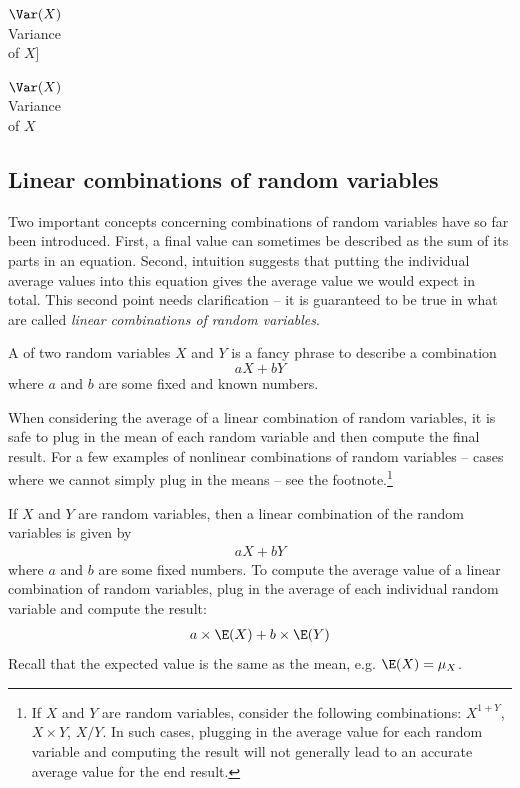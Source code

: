 $\Var(X)$\vspace{1mm}\\\footnotesize Variance\\of $X$]{\raggedright\vspace{-47mm}

$\Var(X)$\vspace{1mm}\\\footnotesize Variance\\of $X$}


\subsection{Linear combinations of random variables}

	Two important concepts concerning combinations of random variables have so far been introduced. First, a final value can sometimes be described as the sum of its parts in an equation. Second, intuition suggests that putting the individual average values into this equation gives the average value we would expect in total. This second point needs clarification -- it is guaranteed to be true in what are called \emph{linear combinations of random variables}.

	A  of two random variables $X$ and $Y$ is a fancy phrase to describe a combination
	$$ aX + bY$$
	where $a$ and $b$ are some fixed and known numbers.

	When considering the average of a linear combination of random variables, it is safe to plug in the mean of each random variable and then compute the final result. For a few examples of nonlinear combinations of random variables -- cases where we cannot simply plug in the means -- see the footnote.\footnote{If $X$ and $Y$ are random variables, consider the following combinations: $X^{1+Y}$, $X\times Y$, $X/Y$. In such cases, plugging in the average value for each random variable and computing the result will not generally lead to an accurate average value for the end result.}

	\begin{termBox}{
	If $X$ and $Y$ are random variables, then a linear combination of the random variables is given by
	\begin{align}\label{linComboOfRandomVariablesXAndY}
	aX + bY
	\end{align}
	where $a$ and $b$ are some fixed numbers. To compute the average value of a linear combination of random variables, plug in the average of each individual random variable and compute the result:
	\begin{align*}
	a\times \E(X) + b\times \E(Y)
	\end{align*}
	Recall that the expected value is the same as the mean, e.g. $\E(X) = \mu_X$.}
	\end{termBox}

